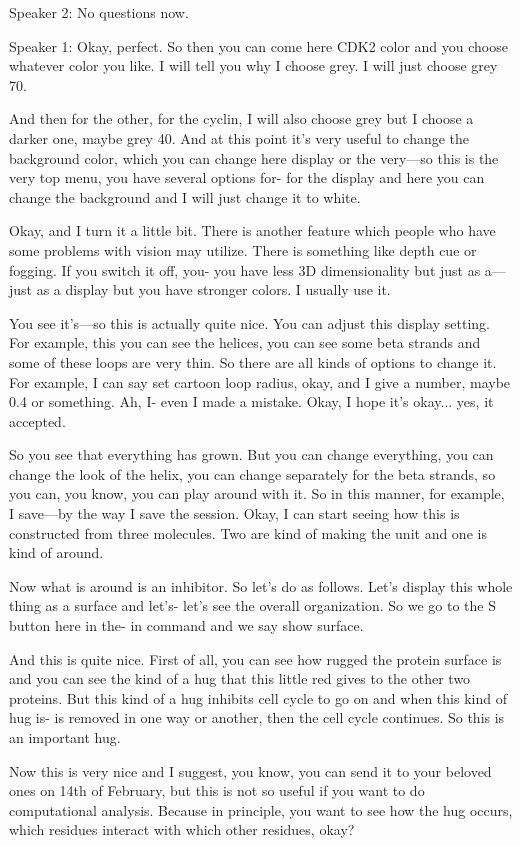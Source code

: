 Speaker 2: No questions now.

Speaker 1: Okay, perfect. So then you can come here CDK2 color and you choose whatever color you like. I will tell you why I choose grey. I will just choose grey 70.

And then for the other, for the cyclin, I will also choose grey but I choose a darker one, maybe grey 40. And at this point it's very useful to change the background color, which you can change here display or the very—so this is the very top menu, you have several options for- for the display and here you can change the background and I will just change it to white.

Okay, and I turn it a little bit. There is another feature which people who have some problems with vision may utilize. There is something like depth cue or fogging. If you switch it off, you- you have less 3D dimensionality but just as a—just as a display but you have stronger colors. I usually use it.

You see it's—so this is actually quite nice. You can adjust this display setting. For example, this you can see the helices, you can see some beta strands and some of these loops are very thin. So there are all kinds of options to change it. For example, I can say set cartoon loop radius, okay, and I give a number, maybe 0.4 or something. Ah, I- even I made a mistake. Okay, I hope it's okay... yes, it accepted.

So you see that everything has grown. But you can change everything, you can change the look of the helix, you can change separately for the beta strands, so you can, you know, you can play around with it. So in this manner, for example, I save—by the way I save the session. Okay, I can start seeing how this is constructed from three molecules. Two are kind of making the unit and one is kind of around.

Now what is around is an inhibitor. So let's do as follows. Let's display this whole thing as a surface and let's- let's see the overall organization. So we go to the S button here in the- in command and we say show surface.

And this is quite nice. First of all, you can see how rugged the protein surface is and you can see the kind of a hug that this little red gives to the other two proteins. But this kind of a hug inhibits cell cycle to go on and when this kind of hug is- is removed in one way or another, then the cell cycle continues. So this is an important hug.

Now this is very nice and I suggest, you know, you can send it to your beloved ones on 14th of February, but this is not so useful if you want to do computational analysis. Because in principle, you want to see how the hug occurs, which residues interact with which other residues, okay?

